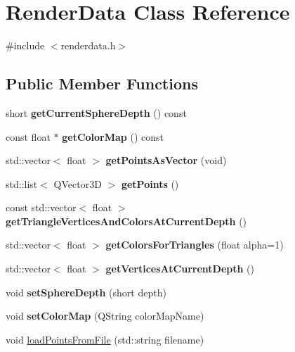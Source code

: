\hypertarget{class_render_data}{}\section{Render\+Data Class Reference}
\label{class_render_data}


{\ttfamily \#include $<$renderdata.\+h$>$}

\subsection*{Public Member Functions}
\begin{DoxyCompactItemize}
\item 
\mbox{\label{class_render_data_aa07295cc6e370997b02e68c917ff05de}} 
short {\bfseries get\+Current\+Sphere\+Depth} () const
\item 
\mbox{\label{class_render_data_aabd6bd86800c7fc53788ef92ccf1ceb8}} 
const float $\ast$ {\bfseries get\+Color\+Map} () const
\item 
\mbox{\label{class_render_data_a9683c1cf21e861efaf1f7c1b7aaa2cf9}} 
std\+::vector$<$ float $>$ {\bfseries get\+Points\+As\+Vector} (void)
\item 
\mbox{\label{class_render_data_ac3ddb0af8cf9a0f2fb4d69815cf76b9d}} 
std\+::list$<$ Q\+Vector3D $>$ {\bfseries get\+Points} ()
\item 
\mbox{\label{class_render_data_a9896a3ed194123ccf5cca42012d4b5e5}} 
const std\+::vector$<$ float $>$ {\bfseries get\+Triangle\+Vertices\+And\+Colors\+At\+Current\+Depth} ()
\item 
\mbox{\label{class_render_data_a58fe3351334cd518b930dfe0a0aa8732}} 
std\+::vector$<$ float $>$ {\bfseries get\+Colors\+For\+Triangles} (float alpha=1)
\item 
\mbox{\label{class_render_data_a8cd691fd6f3cfbd22a1b84daffd2dba2}} 
std\+::vector$<$ float $>$ {\bfseries get\+Vertices\+At\+Current\+Depth} ()
\item 
\mbox{\label{class_render_data_a8d5f7285d29dc9ca0f93fcf2b5826283}} 
void {\bfseries set\+Sphere\+Depth} (short depth)
\item 
\mbox{\label{class_render_data_adb1961bf93370d67c9efb416fde8fefb}} 
void {\bfseries set\+Color\+Map} (Q\+String color\+Map\+Name)
\item 
void \hyperlink{class_render_data_ac161f29f7d6ae6fd3912e8af7bdccdfd}{load\+Points\+From\+File} (std\+::string filename)
\end{DoxyCompactItemize}
